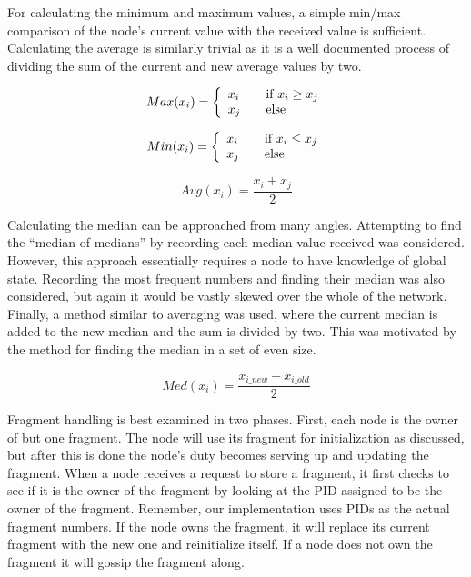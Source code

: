 For calculating the minimum and maximum values, a simple min/max comparison of the node's current value with the received value is sufficient. Calculating the average is similarly trivial as it is a well documented process of dividing the sum of the current and new average values by two.

\begin{equation*}
Max(x_i) = \left\{
  \begin{array}{l l}
    x_i & \quad \textrm{if $x_i \geq x_j$}\\
    x_j & \quad \textrm{else}\\
  \end{array} \right.
\end{equation*}

\begin{equation*}
Min(x_i) = \left\{
  \begin{array}{l l}
    x_i & \quad \textrm{if $x_i \leq x_j$}\\
    x_j & \quad \textrm{else}\\
  \end{array} \right.
\end{equation*}

\begin{equation*}
Avg(x_i)=\frac{x_i + x_j}{2}
\end{equation*}



Calculating the median can be approached from many angles. Attempting to find the “median of medians” by recording each median value received was considered. However, this approach essentially requires a node to have knowledge of global state. Recording the most frequent numbers and finding their median was also considered, but again it would be vastly skewed over the whole of the network. Finally, a method similar to averaging was used, where the current median is added to the new median and the sum is divided by two. This was motivated by the method for finding the median in a set of even size.

\begin{equation*}
Med(x_i)=\frac{x_{i\_new} + x_{i\_old}}{2}
\end{equation*}

Fragment handling is best examined in two phases. First, each node is the owner of but one fragment. The node will use its fragment for initialization as discussed, but after this is done the node's duty becomes serving up and updating the fragment. When a node receives a request to store a fragment, it first checks to see if it is the owner of the fragment by looking at the PID assigned to be the owner of the fragment. Remember, our implementation uses PIDs as the actual fragment numbers. If the node owns the fragment, it will replace its current fragment with the new one and reinitialize itself. If a node does not own the fragment it will gossip the fragment along.



